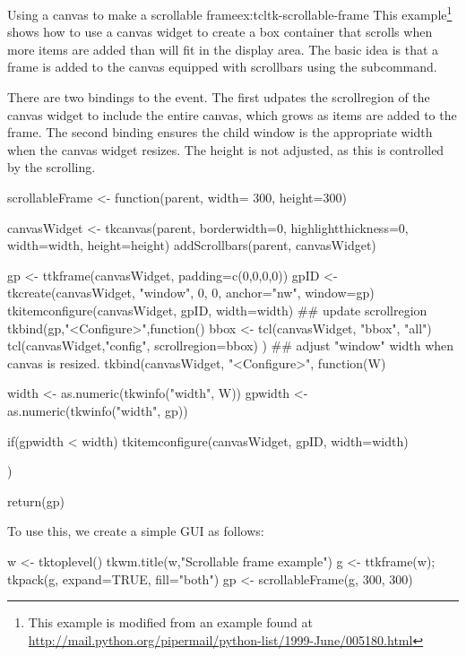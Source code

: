 \begin{example}{Using a canvas to make a scrollable frame}{ex:tcltk-scrollable-frame}
This example\footnote{This example is modified from an example found
  at \url{
    http://mail.python.org/pipermail/python-list/1999-June/005180.html}}
shows how to use a canvas widget to create a box container that
scrolls when more items are added than will fit in the display
area. The basic idea is that a frame is added to the canvas equipped
with scrollbars using the 
subcommand. 

There are two bindings to the  event. The first
udpates the scrollregion of the canvas widget to include the entire
canvas, which grows as items are added to the frame. The second
binding ensures the child window is the appropriate width when the
canvas widget resizes. The height is not adjusted, as this is
controlled by the scrolling.

\begin{Schunk}
\begin{Sinput}
 scrollableFrame <- function(parent, width= 300, height=300) {
   canvasWidget <- 
     tkcanvas(parent,
              borderwidth=0, highlightthickness=0,
              width=width, height=height)
   addScrollbars(parent, canvasWidget)
 
   gp <- ttkframe(canvasWidget, padding=c(0,0,0,0))
   gpID <- tkcreate(canvasWidget, "window", 0, 0, anchor="nw", 
                    window=gp)
   tkitemconfigure(canvasWidget, gpID, width=width)
   ## update scrollregion
   tkbind(gp,"<Configure>",function() {  
     bbox <- tcl(canvasWidget, "bbox", "all")
     tcl(canvasWidget,"config", scrollregion=bbox)
   })
   ## adjust "window" width when canvas is resized.
   tkbind(canvasWidget, "<Configure>", function(W) {
     width <- as.numeric(tkwinfo("width", W))
     gpwidth <- as.numeric(tkwinfo("width", gp))
     
     if(gpwidth < width)
       tkitemconfigure(canvasWidget, gpID, width=width)
   })
 
   
   return(gp)
 }
\end{Sinput}
\end{Schunk}

To use this, we create a simple GUI as follows:
\begin{Schunk}
\begin{Sinput}
 w <- tktoplevel()
 tkwm.title(w,"Scrollable frame example")
 g <- ttkframe(w); tkpack(g, expand=TRUE, fill="both")
 gp <- scrollableFrame(g, 300, 300)
\end{Sinput}
\end{Schunk}


\end{example}
